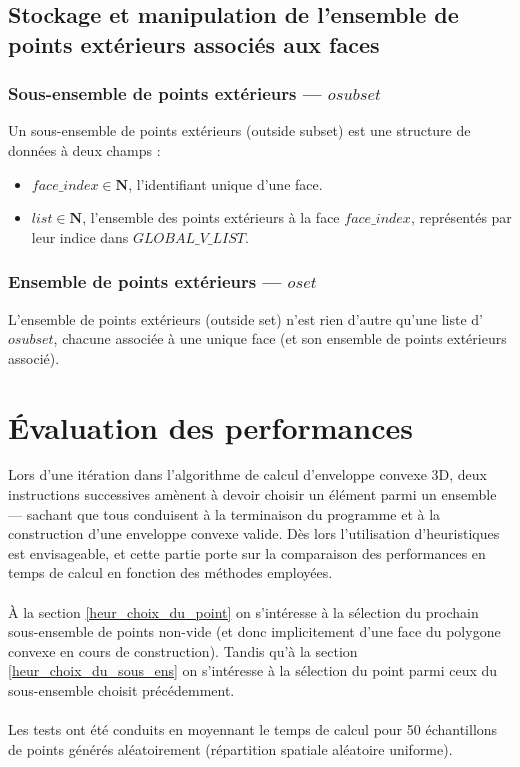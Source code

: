 \documentclass[]{article}
\begin{document}
\subsection{Stockage et manipulation de l'ensemble de points extérieurs associés aux faces}
\subsubsection*{Sous-ensemble de points extérieurs — $osubset$}
Un sous-ensemble de points extérieurs (outside subset) est une structure de données à deux champs :
\begin{itemize}
	\item $face\_index \in \mathbf{N}$, l'identifiant unique d'une face.
	\item $list \in \mathbf{N}$, l'ensemble des points extérieurs à la face $face\_index$, représentés par leur indice dans $GLOBAL\_V\_LIST$.
\end{itemize}

\subsubsection*{Ensemble de points extérieurs — $oset$}
L'ensemble de points extérieurs (outside set) n'est rien d'autre qu'une liste d'$osubset$, chacune associée à une unique face (et son ensemble de points extérieurs associé).


\section{Évaluation des performances}
Lors d'une itération dans l'algorithme de calcul d'enveloppe convexe 3D, deux instructions successives amènent à devoir choisir un élément parmi un ensemble — sachant que tous conduisent à la terminaison du programme et à la construction d'une enveloppe convexe valide. Dès lors l'utilisation d'heuristiques est envisageable, et cette partie porte sur la comparaison des performances en temps de calcul en fonction des méthodes employées.\\\\
À la section \ref{heur_choix_du_point} on s'intéresse à la sélection du prochain sous-ensemble de points non-vide (et donc implicitement d'une face du polygone convexe en cours de construction).
Tandis qu'à la section \ref{heur_choix_du_sous_ens} on s'intéresse à la sélection du point parmi ceux du sous-ensemble choisit précédemment.\\\\
Les tests ont été conduits en moyennant le temps de calcul pour 50 échantillons de points générés aléatoirement (répartition spatiale aléatoire uniforme).
\end{document}
